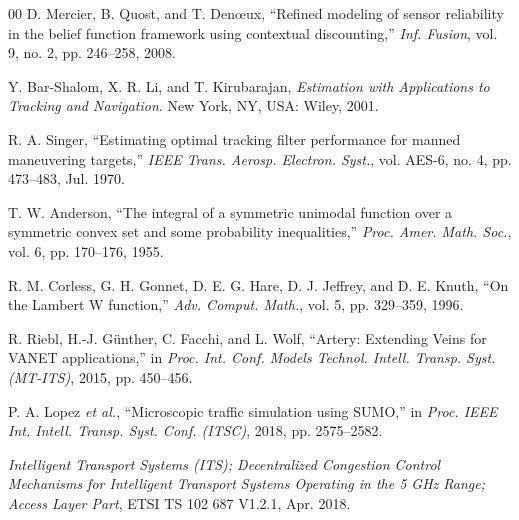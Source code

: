 \documentclass[conference]{IEEEtran}
\begin{document}
\begin{thebibliography}{00}
 D. Mercier, B. Quost, and T. Den{\oe}ux, ``Refined
modeling of sensor reliability in the belief function framework using
contextual discounting,'' \emph{Inf. Fusion}, vol. 9, no. 2, pp. 246--258,
2008.

 Y. Bar-Shalom, X. R. Li, and T. Kirubarajan,
\emph{Estimation with Applications to Tracking and Navigation}. New York, NY,
USA: Wiley, 2001.

 R. A. Singer, ``Estimating optimal tracking filter
performance for manned maneuvering targets,'' \emph{IEEE Trans. Aerosp.
Electron. Syst.}, vol. AES-6, no. 4, pp. 473--483, Jul. 1970.

 T. W. Anderson, ``The integral of a symmetric unimodal
function over a symmetric convex set and some probability inequalities,''
\emph{Proc. Amer. Math. Soc.}, vol. 6, pp. 170--176, 1955.

 R. M. Corless, G. H. Gonnet, D. E. G. Hare,
D. J. Jeffrey, and D. E. Knuth, ``On the Lambert W function,'' \emph{Adv.
Comput. Math.}, vol. 5, pp. 329--359, 1996.

 R. Riebl, H.-J. G\"unther, C. Facchi, and L. Wolf,
``Artery: Extending Veins for VANET applications,'' in \emph{Proc. Int. Conf.
Models Technol. Intell. Transp. Syst. (MT-ITS)}, 2015, pp. 450--456.

 P. A. Lopez \emph{et al.}, ``Microscopic traffic
simulation using SUMO,'' in \emph{Proc. IEEE Int. Intell. Transp. Syst. Conf.
(ITSC)}, 2018, pp. 2575--2582.

 \emph{Intelligent Transport Systems (ITS); Decentralized
Congestion Control Mechanisms for Intelligent Transport Systems Operating in
the 5 GHz Range; Access Layer Part}, ETSI TS 102 687 V1.2.1, Apr. 2018.

\end{thebibliography}
\end{document}
